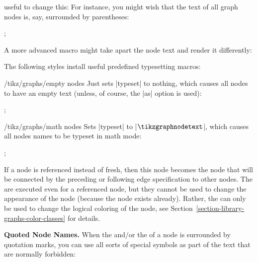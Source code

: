 \begin{itemize}
        useful to change this: For instance, you might wish that the text of
        all graph nodes is, say, surrounded by parentheses:
\begin{codeexample}[]
\tikz {};
\end{codeexample}
        A more advanced macro might take apart the node text and render it
        differently:
        The following styles install useful predefined typesetting macros:
        \begin{key}{/tikz/graphs/empty nodes}
            Just sets |typeset| to nothing, which causes all nodes to have an
            empty text (unless, of course, the |as| option is used):
\begin{codeexample}[]
\tikz {};
\end{codeexample}
        \end{key}
        \begin{key}{/tikz/graphs/math nodes}
            Sets |typeset| to |$\tikzgraphnodetext$|, which causes all nodes
            names to be typeset in math mode:
\begin{codeexample}[]
\tikz {};
\end{codeexample}
        \end{key}
\end{itemize}

If a node is referenced instead of fresh, then this node becomes the node that
will be connected by the preceding or following edge specification to other
nodes. The  are executed even for a referenced node, but they
cannot be used to change the appearance of the node (because the node exists
already). Rather, the  can only be used to change the logical
coloring of the node, see Section~\ref{section-library-graphs-color-classes}
for details.

\medskip
\textbf{Quoted Node Names.} When the  and/or the  of
a node is surrounded by quotation marks, you can use all sorts of special
symbols as part of the text that are normally forbidden:
%
\begin{codeexample}[]
\end{codeexample}

